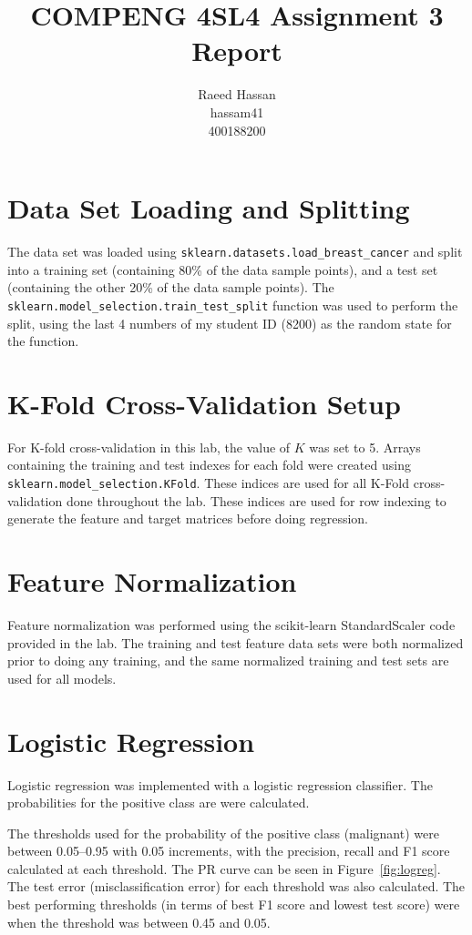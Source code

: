 \documentclass[12pt]{article}
\title{COMPENG 4SL4 Assignment 3 Report}
\author{
    Raeed Hassan \\
    hassam41 \\
    400188200
}
\begin{document}
\maketitle
\clearpage

\section*{Data Set Loading and Splitting}
The data set was loaded using \texttt{sklearn.datasets.load\_breast\_cancer} and split into a training set (containing 80\% of the data sample points), and a test set (containing the other 20\% of the data sample points). The \texttt{sklearn.model\_selection.train\_test\_split} function was used to perform the split, using the last 4 numbers of my student ID (8200) as the random state for the function.

\section*{K-Fold Cross-Validation Setup}
For K-fold cross-validation in this lab, the value of $K$ was set to 5. Arrays containing the training and test indexes for each fold were created using \texttt{sklearn.model\_selection.KFold}. These indices are used for all K-Fold cross-validation done throughout the lab. These indices are used for row indexing to generate the feature and target matrices before doing regression.

\section*{Feature Normalization}
Feature normalization was performed using the scikit-learn StandardScaler code provided in the lab. The training and test feature data sets were both normalized prior to doing any training, and the same normalized training and test sets are used for all models.

\section*{Logistic Regression}
Logistic regression was implemented with a logistic regression classifier. The probabilities for the positive class are were calculated.

The thresholds used for the probability of the positive class (malignant) were between 0.05--0.95 with 0.05 increments, with the precision, recall and F1 score calculated at each threshold. The PR curve can be seen in Figure~\ref{fig:logreg}. The test error (misclassification error) for each threshold was also calculated. The best performing thresholds (in terms of best F1 score and lowest test score) were when the threshold was between 0.45 and 0.05.
\end{document}
